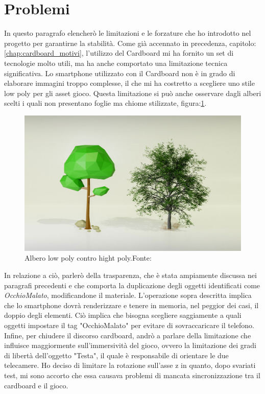 \documentclass[
a4paper,
cleardoublepage=empty,
headings=twolinechapter,
numbers=autoenddot,
]{scrbook}
\begin{document}
	\section{Problemi}
    In questo paragrafo elencherò le limitazioni e le forzature che ho introdotto nel progetto per garantirne la stabilità. Come già accennato in precedenza, capitolo:\ref{chap:cardboard_motivi}, l'utilizzo del Cardboard mi ha fornito un set di tecnologie molto utili, ma ha anche comportato una limitazione tecnica significativa. Lo smartphone utilizzato con il Cardboard non è in grado di elaborare immagini troppo complesse, il che mi ha costretto a scegliere uno stile low poly per gli asset gioco. Questa limitazione si può anche osservare dagli alberi scelti i quali non presentano foglie ma chiome stilizzate, figura:\ref{fig:low_hight}.
	\begin{figure}[H]
		\centering
		\includegraphics[width=0.6\linewidth]{image/low_hight}
		\caption{Albero low poly contro hight poly.Fonte:\cite{low_high}}
		\label{fig:low_hight}
	\end{figure}
   In relazione a ciò, parlerò della trasparenza, che è stata ampiamente discussa nei paragrafi precedenti e che comporta la duplicazione degli oggetti identificati come \textit{OcchioMalato}, modificandone il materiale. L'operazione sopra descritta implica che lo smartphone dovrà renderizzare e tenere in memoria, nel peggior dei casi, il doppio degli elementi. Ciò implica che bisogna scegliere saggiamente a quali oggetti impostare il tag "OcchioMalato" per evitare di sovraccaricare il telefono.
   Infine, per chiudere il discorso cardboard, andrò a parlare della limitazione che influisce maggiormente sull'immersività del gioco, ovvero la limitazione dei gradi di libertà dell'oggetto "Testa", il quale è responsabile di orientare le due telecamere. Ho deciso di limitare la rotazione sull'asse z in quanto, dopo svariati test, mi sono accorto che essa causava problemi di mancata sincronizzazione tra il cardboard e il gioco.\\\\
\end{document}
